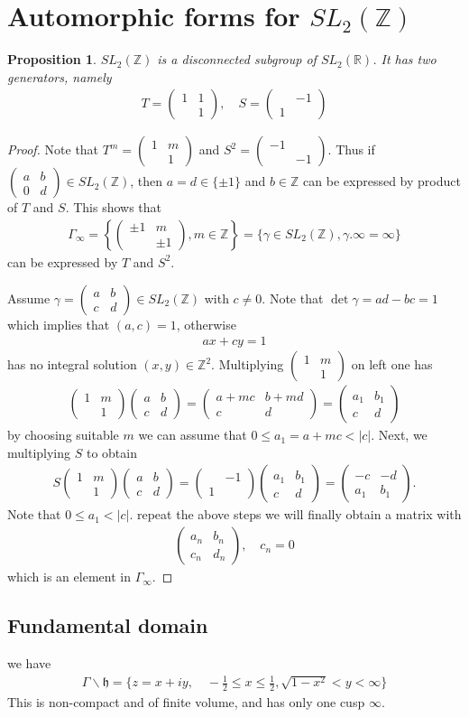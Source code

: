 \documentclass[11pt,reqno]{amsart}
\newcommand{\bna}{\begin{eqnarray*}}
\newcommand{\ena}{\end{eqnarray*}}
\newcommand{\bma}{\begin{pmatrix}}
\newcommand{\ema}{\end{pmatrix}}
\newcommand{\mk}{\mathfrak}
\def\R{\mathbb{R}}
\def\Z{\mathbb{Z}}
\newtheorem{prop}[lemma]{Proposition}
\theoremstyle{definition}
\begin{document}
\section{Automorphic forms for $SL_2(\Z)$}
\begin{prop}
$SL_2(\Z)$ is a disconnected subgroup of $SL_2(\R)$. It has two generators, namely
\bna
T=\bma 1&1\\&1\ema,\quad S=\bma &-1\\ 1\ema
\ena
\end{prop}
\begin{proof}
Note that $T^m=\bma 1&m\\&1\ema$ and $S^2=\bma -1\\&-1\ema$.
Thus if $\bma a&b\\0&d\ema\in SL_2(\Z)$, then $a=d\in\{\pm 1\}$ and $b\in \Z$
can be expressed by product of $T$ and $S$. This shows that
\bna
\Gamma_\infty=\left\{\bma\pm 1&m\\&\pm 1\ema,m\in\Z\right\}
=\{\gamma\in SL_2(\Z),\gamma.\infty=\infty\}
\ena
can be expressed by $T$ and $S^2$.


Assume $\gamma=\bma a&b\\c&d\ema\in SL_2(\Z)$ with $c\neq 0$.
Note that $\det\gamma=ad-bc=1$ which implies that $(a,c)=1$, otherwise
\bna
ax+cy=1
\ena
has no integral solution $(x,y)\in \Z^2$.
Multiplying $\bma 1&m\\&1\ema$ on left one has
\bna
\bma 1&m\\&1\ema\bma a&b\\c&d\ema=\bma a+mc&b+md\\c&d\ema=\bma a_1&b_1\\c&d\ema
\ena
by choosing suitable $m$ we can assume that $0\leq a_1=a+mc<|c|$.
Next, we multiplying $S$ to obtain
\bna
S\bma 1&m\\&1\ema\bma a&b\\c&d\ema=\bma &-1\\1\ema\bma a_1&b_1\\c&d\ema
=\bma -c&-d\\ a_1&b_1\ema .
\ena
Note that $0\leq a_1<|c|.$
repeat the above steps we will finally obtain a matrix with
\bna
\bma a_n&b_n\\ c_n&d_n\ema,\quad c_n=0
\ena
which is an element in $\Gamma_\infty$.
\end{proof}



\subsection{Fundamental domain}
we have
\bna
\Gamma\backslash \mk h=\{z=x+iy,\quad -\frac{1}{2}\leq x\leq\frac{1}{2},  \sqrt{1-x^2}<y<\infty\}
\ena
This is non-compact and of finite volume, and has only one cusp $\infty$.
\end{document}
